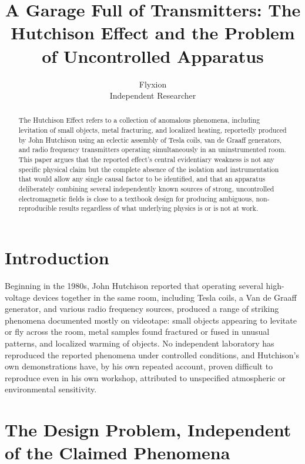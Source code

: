 \documentclass[11pt]{article}
\title{A Garage Full of Transmitters: The Hutchison Effect and the Problem of Uncontrolled Apparatus}
\author{Flyxion \\ \small Independent Researcher}
\date{}
\begin{document}
\maketitle

\begin{abstract}
The Hutchison Effect refers to a collection of anomalous phenomena, including levitation of small objects, metal fracturing, and localized heating, reportedly produced by John Hutchison using an eclectic assembly of Tesla coils, van de Graaff generators, and radio frequency transmitters operating simultaneously in an uninstrumented room. This paper argues that the reported effect's central evidentiary weakness is not any specific physical claim but the complete absence of the isolation and instrumentation that would allow any single causal factor to be identified, and that an apparatus deliberately combining several independently known sources of strong, uncontrolled electromagnetic fields is close to a textbook design for producing ambiguous, non-reproducible results regardless of what underlying physics is or is not at work.
\end{abstract}

\section{Introduction}

Beginning in the 1980s, John Hutchison reported that operating several high-voltage devices together in the same room, including Tesla coils, a Van de Graaff generator, and various radio frequency sources, produced a range of striking phenomena documented mostly on videotape: small objects appearing to levitate or fly across the room, metal samples found fractured or fused in unusual patterns, and localized warming of objects. No independent laboratory has reproduced the reported phenomena under controlled conditions, and Hutchison's own demonstrations have, by his own repeated account, proven difficult to reproduce even in his own workshop, attributed to unspecified atmospheric or environmental sensitivity.

\section{The Design Problem, Independent of the Claimed Phenomena}
\end{document}
